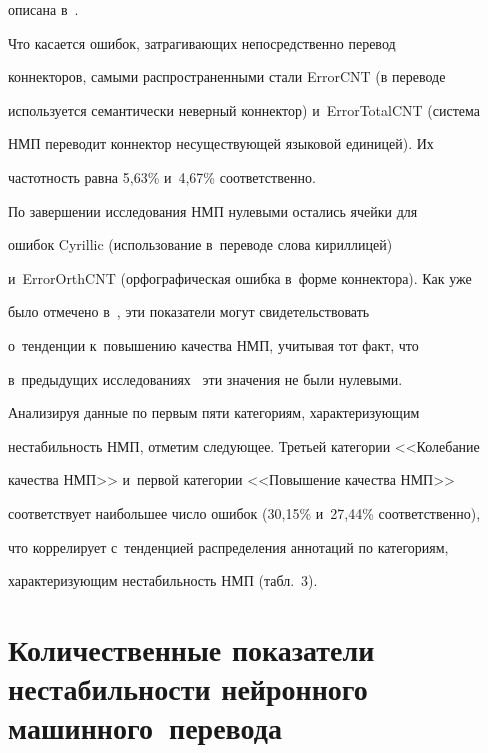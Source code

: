 описана в~\cite{17-ez}.


  


  Что касается ошибок, затрагивающих непосредственно перевод 


коннекторов, самыми распространенными стали ErrorCNT (в переводе 


используется семантически неверный коннектор) и~ErrorTotalCNT (система 


НМП переводит коннектор не\-су\-щест\-ву\-ющей языковой единицей). Их 


час\-тот\-ность равна 5,63\% и~4,67\% соответственно.


   


   По завершении исследования НМП нулевыми остались ячейки для 


ошибок Cyrillic (использование в~переводе слова кириллицей) 


и~ErrorOrthCNT (орфографическая ошибка в~форме коннектора). Как уже 


было отмечено в~\cite{17-ez}, эти показатели могут свидетельствовать 


о~тенденции к~повышению качества НМП, учитывая тот факт, что 


в~предыду\-щих исследованиях~\cite{19-ez} эти значения не были нулевыми.


  


  Анализируя данные по первым пяти категориям, характеризующим 


нестабильность НМП, отметим следующее. Третьей категории <<Колебание 


качества НМП>> и~первой категории <<Повышение качества НМП>> 


соответствует наибольшее чис\-ло ошибок (30,15\% и~27,44\% соответственно), 


что коррелирует с~тенденцией распределения аннотаций по категориям, 


ха\-рак\-те\-ри\-зу\-ющим нестабильность НМП (табл.~3).





\section{Количественные показатели нестабильности нейронного машинного~перевода}





